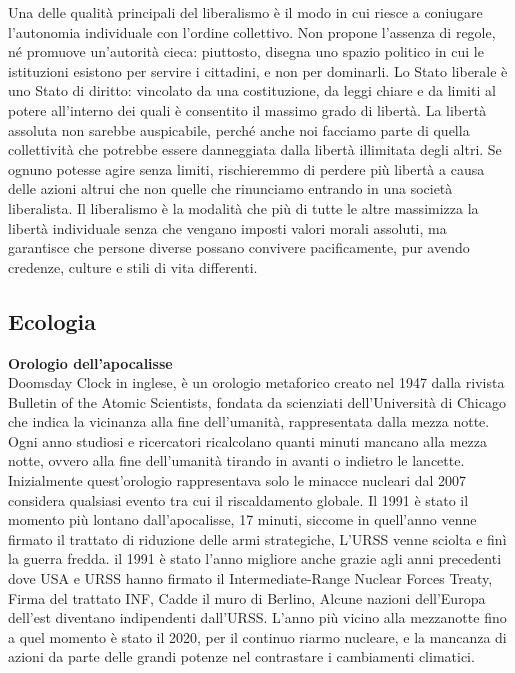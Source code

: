 \documentclass[12pt]{book} %
\begin{document}
Una delle qualità principali del liberalismo è il modo in cui riesce a coniugare l'autonomia individuale con l'ordine collettivo. Non propone l’assenza di regole, né promuove un’autorità cieca: piuttosto, disegna uno spazio politico in cui le istituzioni esistono per servire i cittadini, e non per dominarli. Lo Stato liberale è uno Stato di diritto: vincolato da una costituzione, da leggi chiare e da limiti al potere all'interno dei quali è consentito il massimo grado di libertà. La libertà assoluta non sarebbe auspicabile, perché anche noi facciamo parte di quella collettività che potrebbe essere danneggiata dalla libertà illimitata degli altri. Se ognuno potesse agire senza limiti, rischieremmo di perdere più libertà a causa delle azioni altrui che non quelle che rinunciamo entrando in una società liberalista. Il liberalismo è la modalità che più di tutte le altre massimizza la libertà individuale senza che vengano imposti valori morali assoluti, ma garantisce che persone diverse possano convivere pacificamente, pur avendo credenze, culture e stili di vita differenti.

\clearpage\subsection{Ecologia}

\noindent \textbf{\large Orologio dell'apocalisse} \\
Doomsday Clock in inglese, è un orologio metaforico creato nel 1947 dalla rivista Bulletin of the Atomic Scientists, fondata da scienziati dell’Università di Chicago che indica la vicinanza alla fine dell'umanità,
rappresentata dalla mezza notte. Ogni anno studiosi e ricercatori ricalcolano quanti minuti mancano alla mezza notte,
ovvero alla fine dell'umanità tirando in avanti o indietro le lancette. Inizialmente
quest'orologio rappresentava solo le minacce nucleari dal 2007 considera qualsiasi evento tra cui il
riscaldamento globale. Il 1991 è stato il momento più lontano dall'apocalisse, 17 minuti,
siccome in quell'anno venne firmato il trattato di riduzione delle armi strategiche, L'URSS venne sciolta e finì la
guerra fredda. il 1991 è stato l'anno migliore anche grazie agli anni precedenti dove USA e URSS hanno firmato il
Intermediate-Range Nuclear Forces Treaty, Firma del trattato INF, Cadde il muro di Berlino, Alcune nazioni dell'Europa
dell'est diventano indipendenti dall'URSS. L'anno più vicino alla mezzanotte fino a quel momento è stato il 2020, per il continuo
riarmo nucleare, e la mancanza di azioni da parte delle grandi potenze nel contrastare i cambiamenti climatici.
\end{document}
